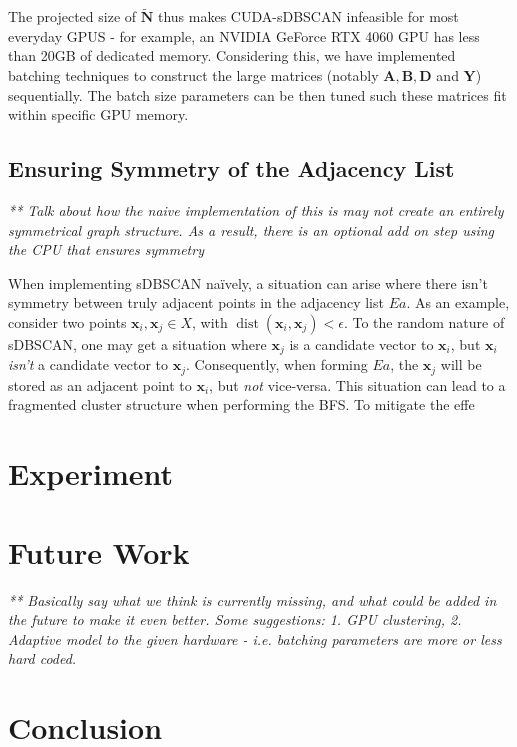 \documentclass{article}
\newcommand{\bx}{\mathbf{x}}
\newcommand{\bxi}{\mathbf{x}_{i}}
\newcommand{\eps}{\epsilon}
\newcommand{\bNt}{\widetilde{\mathbf{N}}}
\newcommand{\bY}{\mathbf{Y}}
\newcommand{\bA}{\mathbf{A}}
\newcommand{\bB}{\mathbf{B}}
\newcommand{\bD}{\mathbf{D}}
\newcommand{\Ea}{\textit{Ea}}
\newcommand{\dist}{\operatorname{dist}}
\begin{document}
The projected size of $\bNt$ thus makes CUDA-sDBSCAN infeasible for most everyday GPUS - for example, an NVIDIA GeForce RTX 4060 GPU \cite{nvidia_rtx_4060} has less than 20GB of dedicated memory. Considering this, we have implemented batching techniques to construct the large matrices (notably $\bA, \bB, \bD$ and $\bY$) sequentially. The batch size parameters can be then tuned such these matrices fit within specific GPU memory.

\subsection{Ensuring Symmetry of the Adjacency List}

\textit{** Talk about how the naive implementation of this is may not create an entirely symmetrical graph structure. As a result, there is an optional add on step using the CPU that ensures symmetry}

When implementing sDBSCAN naïvely, a situation can arise where there isn't symmetry between truly adjacent points in the adjacency list $\Ea$. As an example, consider two points $\bx_i, \bx_j \in X$, with $\dist(\bxi, \bx_j) < \eps$. To the random nature of sDBSCAN, one may get a situation where $\bx_j$ is a candidate vector to $\bxi$, but $\bx_i$ \textit{isn't} a candidate vector to $\bx_j$. Consequently, when forming $\Ea$, the $\bx_j$ will be stored as an adjacent point to $\bx_i$, but \textit{not} vice-versa. This situation can lead to a fragmented cluster structure when performing the BFS. To mitigate the effe

\section{Experiment}

\section{Future Work}

\textit{** Basically say what we think is currently missing, and what could be added in the future to make it even better. Some suggestions: 1. GPU clustering, 2. Adaptive model to the given hardware - i.e. batching parameters are more or less hard coded.}

\section{Conclusion}




\end{document}
